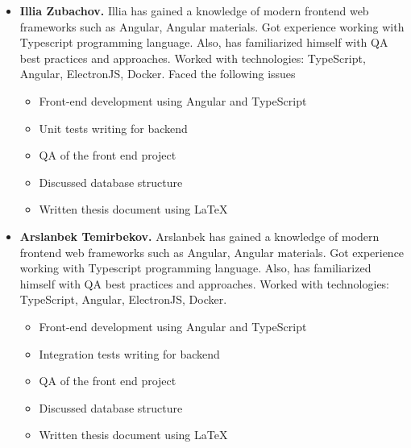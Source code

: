 \begin{itemize}
\begin{itemize}
        Thesis document deployment on GitHub Pages
        \item Discussed database structure
        \item Written thesis document using \LaTeX
        \item Implemented mobile client application using WebView
        \item Front-end development using Angular and TypeScript
    \end{itemize}
    \item \textbf{Illia Zubachov.} Illia has gained a knowledge of modern frontend web frameworks such as
    Angular, Angular materials.
    Got experience working with Typescript programming language.
    Also, has familiarized himself with QA best practices and approaches.
    Worked with technologies: TypeScript, Angular, ElectronJS, Docker.
    Faced the following issues
    \begin{itemize}
        \item Front-end development using Angular and TypeScript
        \item Unit tests writing for backend
        \item QA of the front end project
        \item Discussed database structure
        \item Written thesis document using \LaTeX
    \end{itemize}
    \item \textbf{Arslanbek Temirbekov.} Arslanbek has gained a knowledge of modern frontend web frameworks such as
    Angular, Angular materials.
    Got experience working with Typescript programming language.
    Also, has familiarized himself with QA best practices and approaches.
    Worked with technologies: TypeScript, Angular, ElectronJS, Docker.
    \begin{itemize}
        \item Front-end development using Angular and TypeScript
        \item Integration tests writing for backend
        \item QA of the front end project
        \item Discussed database structure
        \item Written thesis document using \LaTeX
    \end{itemize}
\end{itemize}